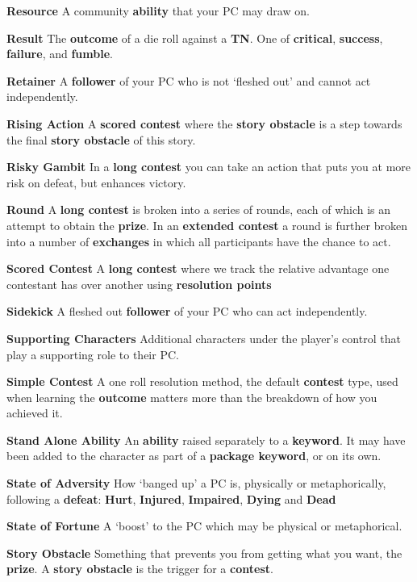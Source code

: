 \documentclass[
]{article}
\begin{document}
\textbf{Resource} A community \textbf{ability} that your PC may draw on.

\textbf{Result} The \textbf{outcome} of a die roll against a
\textbf{TN}. One of \textbf{critical}, \textbf{success},
\textbf{failure}, and \textbf{fumble}.

\textbf{Retainer} A \textbf{follower} of your PC who is not `fleshed
out' and cannot act independently.

\textbf{Rising Action} A \textbf{scored contest} where the \textbf{story
obstacle} is a step towards the final \textbf{story obstacle} of this
story.

\textbf{Risky Gambit} In a \textbf{long contest} you can take an action
that puts you at more risk on defeat, but enhances victory.

\textbf{Round} A \textbf{long contest} is broken into a series of
rounds, each of which is an attempt to obtain the \textbf{prize}. In an
\textbf{extended contest} a round is further broken into a number of
\textbf{exchanges} in which all participants have the chance to act.

\textbf{Scored Contest} A \textbf{long contest} where we track the
relative advantage one contestant has over another using
\textbf{resolution points}

\textbf{Sidekick} A fleshed out \textbf{follower} of your PC who can act
independently.

\textbf{Supporting Characters} Additional characters under the player's
control that play a supporting role to their PC.

\textbf{Simple Contest} A one roll resolution method, the default
\textbf{contest} type, used when learning the \textbf{outcome} matters
more than the breakdown of how you achieved it.

\textbf{Stand Alone Ability} An \textbf{ability} raised separately to a
\textbf{keyword}. It may have been added to the character as part of a
\textbf{package keyword}, or on its own.

\textbf{State of Adversity} How `banged up' a PC is, physically or
metaphorically, following a \textbf{defeat}: \textbf{Hurt},
\textbf{Injured}, \textbf{Impaired}, \textbf{Dying} and \textbf{Dead}

\textbf{State of Fortune} A `boost' to the PC which may be physical or
metaphorical.

\textbf{Story Obstacle} Something that prevents you from getting what
you want, the \textbf{prize}. A \textbf{story obstacle} is the trigger
for a \textbf{contest}.
\end{document}
